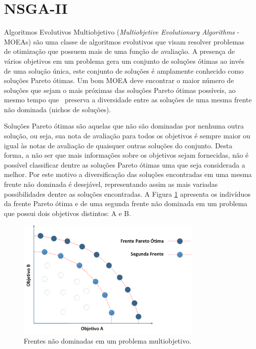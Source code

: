 \section{NSGA-II}

Algoritmos Evolutivos Multiobjetivo (\emph{Multiobjetive Evolutionary Algorithms} - MOEAs) são uma classe de algoritmos evolutivos que visam resolver problemas de otimização que possuem mais de uma função de avaliação. A presença de vários objetivos em um problema gera um conjunto de soluções ótimas ao invés de uma solução única, este conjunto de soluções é amplamente conhecido como soluções Pareto ótimas. Um bom MOEA deve encontrar o maior número de soluções que sejam o mais próximas das soluções Pareto ótimas possíveis, ao mesmo tempo que \ preserva a diversidade entre as soluções de uma mesma frente não dominada (nichos de soluções).

Soluções Pareto ótimas são aquelas que não são dominadas por nenhuma outra solução, ou seja, sua nota de avaliação para todos os objetivos é sempre maior ou igual às notas de avaliação de quaisquer outras soluções do conjunto. Desta forma, a não ser que mais informações sobre os objetivos sejam fornecidas, não é possível classificar dentre as soluções Pareto ótimas uma que seja considerada a melhor. Por este motivo a diversificação das soluções encontradas em uma mesma frente não dominada é desejável, representando assim as mais variadas possibilidades dentre as soluções encontradas. A Figura \ref{fig:nsgaii_pareto_fronts} apresenta os indivíduos da frente Pareto ótima e de uma segunda frente não dominada em um problema que possui dois objetivos distintos: A e B.

\begin{figure}[htb]
	\begin{center}
		\includegraphics[width=0.8\textwidth]{Imagens/nsgaii_pareto_fronts.png}
		\caption{Frentes não dominadas em um problema multiobjetivo.}
		\label{fig:nsgaii_pareto_fronts}
	\end{center}
\end{figure}

